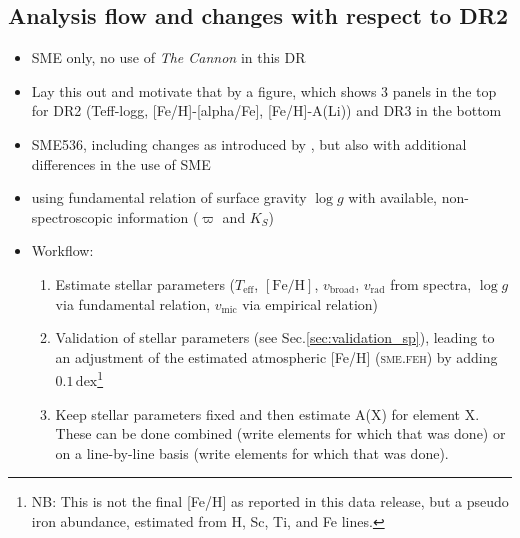\documentclass[fleqn,usenatbib,useAMS]{mnras}
\newcommand{\teff}{$T_\mathrm{eff}$\xspace}
\newcommand{\logg}{$\log g$\xspace}
\newcommand{\feh}{$\mathrm{[Fe/H]}$\xspace}
\newcommand{\vmic}{$v_\mathrm{mic}$\xspace}
\newcommand{\vbroad}{$v_\mathrm{broad}$\xspace}
\newcommand{\vrad}{$v_\mathrm{rad}$\xspace}
\begin{document}
\subsection{Analysis flow and changes with respect to DR2} \label{sec:analysis_flow}

\begin{itemize}
\item SME only, no use of \textit{The Cannon} in this DR
\item Lay this out and motivate that by a figure, which shows 3 panels in the top for DR2 (Teff-logg, [Fe/H]-[alpha/Fe], [Fe/H]-A(Li)) and DR3 in the bottom
\item SME536, including changes as introduced by \citet{Piskunov2017}, but also with additional differences in the use of SME
\item using fundamental relation of surface gravity $\log g$ with available, non-spectroscopic information ($\varpi$ and $K_S$)
\item Workflow: 
\begin{enumerate}
	\item Estimate stellar parameters (\teff, \feh, \vbroad, \vrad from spectra, \logg via fundamental relation, \vmic via empirical relation)
	\item Validation of stellar parameters (see Sec.\ref{sec:validation_sp}), leading to an adjustment of the estimated atmospheric [Fe/H] (\textsc{sme.feh}) by adding $0.1\,\mathrm{dex}$\footnote{NB: This is not the final [Fe/H] as reported in this data release, but a pseudo iron abundance, estimated from H, Sc, Ti, and Fe lines.}
	\item Keep stellar parameters fixed and then estimate A(X) for element X. These can be done combined (write elements for which that was done) or on a line-by-line basis (write elements for which that was done).
\end{enumerate}
\end{itemize}
\end{document}
